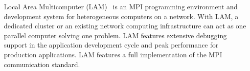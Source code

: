 Local Area Multicomputer (LAM)~\cite{LAM}
is an MPI programming environment and development system for heterogeneous 
computers on a network. 
With LAM, a dedicated cluster or an existing network
computing infrastructure can act as one parallel computer solving
one problem.  LAM features extensive debugging support in the
application development cycle and peak performance for production
applications. LAM features a full implementation of the MPI
communication standard.

%
%
%
%
%
%
%
%
%
%
